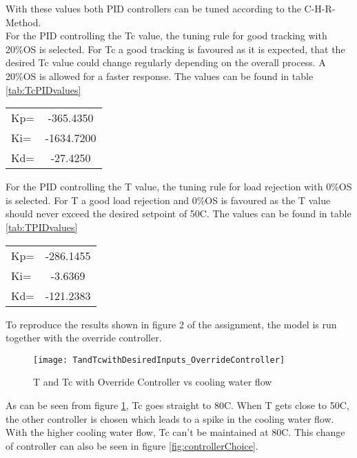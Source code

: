 With these values both PID controllers can be tuned according to the C-H-R-Method.\\
For the PID controlling the Tc value, the tuning rule for good tracking with 20\%OS is selected. For Tc a good tracking is favoured as it is expected, that the desired Tc value could change regularly depending on the overall process. A 20\%OS is allowed for a faster response. The values can be found in table \ref{tab:TcPIDvalues}\\
\begin{center}
	
	\begin{tabular}{|l c}
		Kp=	&-365.4350	\\
		Ki=	&-1634.7200	\\
		Kd=	&-27.4250	\\		
	\end{tabular}
	\label{tab:TcPIDvalues}
\end{center}
For the PID controlling the T value, the tuning rule for load rejection with 0\%OS is selected. For T a good load rejection and 0\%OS is favoured as the T value should never exceed the desired setpoint of 50\degree C. The values can be found in table \ref{tab:TPIDvalues}\\
\begin{center}
	
	\begin{tabular}{|l c}
		Kp=	&-286.1455	\\
		Ki=	&-3.6369	\\
		Kd=	&-121.2383	\\		
	\end{tabular}
	\label{tab:TPIDvalues}
\end{center}


To reproduce the results shown in figure 2 of the assignment, the model is run together with the override controller. 


\begin{figure}[H]
	\centering
	\texttt{[image: TandTcwithDesiredInputs\_OverrideController]}
	\caption{T and Tc with Override Controller vs cooling water flow}
	\label{fig:OverrideControllerResponse}
\end{figure}

As can be seen from figure \ref{fig:OverrideControllerResponse}, Tc goes straight to 80\degree C. When T gets close to 50\degree C, the other controller is chosen which leads to a spike in the cooling water flow. With the higher cooling water flow, Tc can't be maintained at 80\degree C. This change of controller can also be seen in figure \ref{fig:controllerChoice}.


